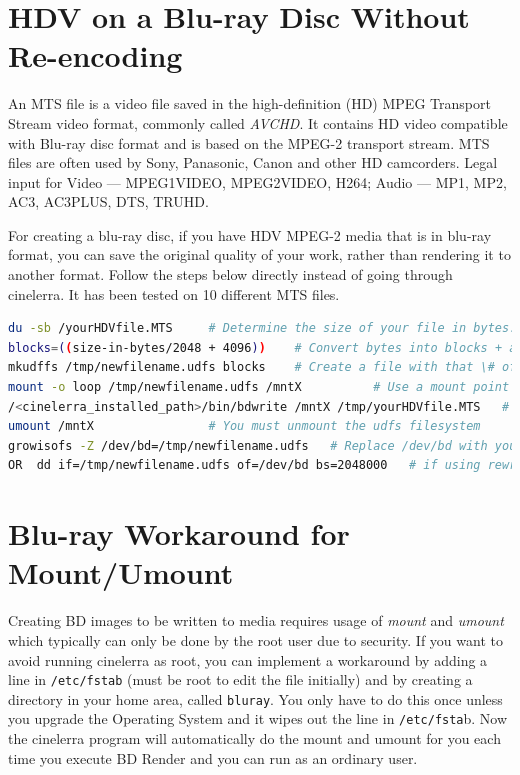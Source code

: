 \section{HDV on a Blu-ray Disc Without Re-encoding}%
\label{sec:hdv_bd_without_reencoding}

An MTS file is a video file saved in the high-definition (HD) MPEG Transport Stream video format, commonly called \textit{AVCHD}.  It contains HD video compatible with Blu-ray disc format and is based on the MPEG-2 transport stream.   MTS files are often used by Sony, Panasonic, Canon and other HD camcorders.  Legal input for Video --- MPEG1VIDEO, MPEG2VIDEO, H264; Audio --- MP1, MP2, AC3, AC3PLUS, DTS, TRUHD. 

For creating a blu-ray disc, if you have HDV MPEG-2 media that is in blu-ray format, you can save the original quality of your work, rather than rendering it to another format.  Follow the steps below directly instead of going through cinelerra.  It has been tested on 10 different MTS files.

\begin{lstlisting}[language=bash]
du -sb /yourHDVfile.MTS		# Determine the size of your file in bytes.
blocks=((size-in-bytes/2048 + 4096))	# Convert bytes into blocks + a little more.	
mkudffs /tmp/newfilename.udfs blocks	# Create a file with that \# of blocks + some extra.
mount -o loop /tmp/newfilename.udfs /mntX          # Use a mount point like mntX that is not in use.
/<cinelerra_installed_path>/bin/bdwrite /mntX /tmp/yourHDVfile.MTS   # Substitute cinelerra path.
umount /mntX				# You must unmount the udfs filesystem
growisofs -Z /dev/bd=/tmp/newfilename.udfs   # Replace /dev/bd with your bluray hardware device.
OR  dd if=/tmp/newfilename.udfs of=/dev/bd bs=2048000   # if using rewritable blu-ray; replace bd.
\end{lstlisting}

\section{Blu-ray Workaround for Mount/Umount}%
\label{sec:bluray_workaround_mount_umount}

Creating BD images to be written to media requires usage of \textit{mount} and \textit{umount} which typically can only be done by the root user due to security.  If you want to avoid running cinelerra as root, you can implement a workaround by adding a line in \texttt{/etc/fstab} (must be root to edit the file initially) and by creating a directory in your home area, called \texttt{bluray}.  You only have to do this once unless you upgrade the Operating System and it wipes out the line in \texttt{/etc/fsta}b.  Now the cinelerra program will automatically do the mount and umount for you each time you execute BD Render and you can run as an ordinary user.

